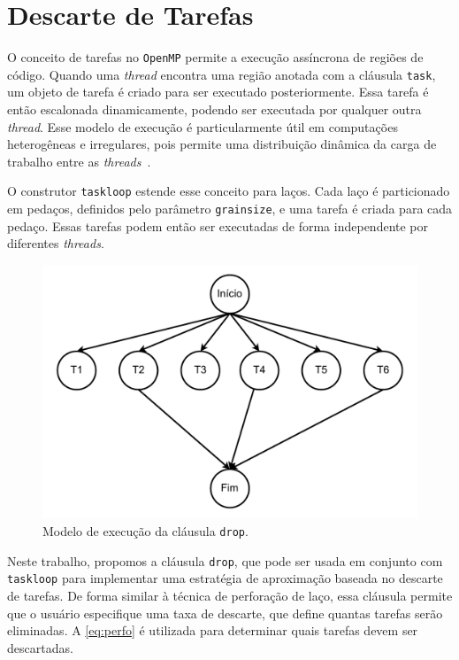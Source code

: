 \section{Descarte de Tarefas}\label{subsec:pragmaTaskdrop}

O conceito de tarefas no \texttt{OpenMP} permite a execução assíncrona de regiões de código. Quando uma \textit{thread} encontra uma região anotada com a cláusula \texttt{task}, um objeto de tarefa é criado para ser executado posteriormente. Essa tarefa é então escalonada dinamicamente, podendo ser executada por qualquer outra \textit{thread}. Esse modelo de execução é particularmente útil em computações heterogêneas e irregulares, pois permite uma distribuição dinâmica da carga de trabalho entre as \textit{threads}~\cite{ayguade2007,openmpapi52}.

O construtor \texttt{taskloop} estende esse conceito para laços. Cada laço é particionado em pedaços, definidos pelo parâmetro \texttt{grainsize}, e uma tarefa é criada para cada pedaço. Essas tarefas podem então ser executadas de forma independente por diferentes \textit{threads}.

\begin{figure}[htb]
    \centering
    \includegraphics[width=\textwidth]{figuras/task.pdf}
    \caption{Modelo de execução da cláusula \texttt{drop}.}
    \label{fig:task_drop}
\end{figure}

Neste trabalho, propomos a cláusula \texttt{drop}, que pode ser usada em conjunto com \texttt{taskloop} para implementar uma estratégia de aproximação baseada no descarte de tarefas. De forma similar à técnica de perforação de laço, essa cláusula permite que o usuário especifique uma taxa de descarte, que define quantas tarefas serão eliminadas. A \autoref{eq:perfo} é utilizada para determinar quais tarefas devem ser descartadas.

